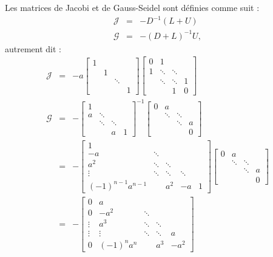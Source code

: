 Les matrices de Jacobi et de Gauss-Seidel sont définies comme suit :
\begin{eqnarray}
\mathcal{J} &=& -D^{-1}(L+U)\\
\mathcal{G} &=& -(D+L)^{-1}U,
\end{eqnarray}
autrement dit :
\begin{eqnarray}
\mathcal{J} &=& - a
\left[
\begin{array}{cccc}
1 & & &\\
 & 1 & &\\
 & & \ddots & \\
  & & & 1
\end{array}
\right]
\left[
\begin{array}{cccc}
0 & 1& &\\
1 & \ddots & \ddots &\\
 & \ddots & \ddots & 1 \\
  & & 1 & 0
\end{array}
\right]\\
\mathcal{G} & = & -
\left[
\begin{array}{cccc}
1 & & &\\
a & \ddots &  &\\
 & \ddots & \ddots  &  \\
  & & a & 1
\end{array}
\right] ^{-1}
\left[
\begin{array}{cccc}
0 & a & &\\
 & \ddots &  \ddots &\\
 &  & \ddots  & a \\
  & &  & 0
\end{array}
\right]
\\
&=& -
\left[
\begin{array}{ccccc}
1 & & & &\\
-a & \ddots &  & &\\
a^2 & \ddots & \ddots  &  &\\
 \vdots & \ddots & \ddots & \ddots & \\
(-1)^{n-1}a^{n-1} & & a^2 & -a & 1
\end{array}
\right]
\left[
\begin{array}{cccc}
0 & a & &\\
 & \ddots &  \ddots &\\
 &  & \ddots  & a \\
  & &  & 0
\end{array}
\right]\\
&=& -
\left[
\begin{array}{ccccc}
0 & a & & &\\
0 & -a^2 & \ddots  & &\\
\vdots & a^3 & \ddots & \ddots  &\\
\vdots & \vdots & \ddots & \ddots  & a \\
0 & (-1)^n a^n & & a^3 & -a^2
\end{array}
\right]
\end{eqnarray}

